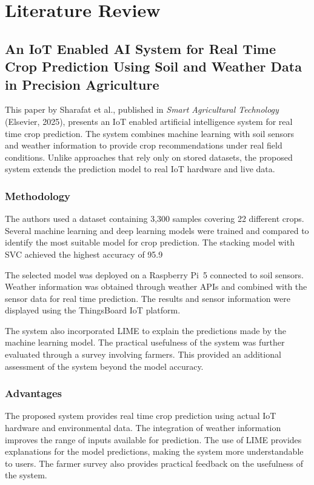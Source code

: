 \chapter{Literature Review}

\section{An IoT Enabled AI System for Real Time Crop Prediction Using Soil and Weather Data in Precision Agriculture}

This paper by Sharafat et al., published in \emph{Smart Agricultural Technology} (Elsevier, 2025), presents an IoT enabled artificial intelligence system for real time crop prediction. The system combines machine learning with soil sensors and weather information to provide crop recommendations under real field conditions. Unlike approaches that rely only on stored datasets, the proposed system extends the prediction model to real IoT hardware and live data.

\subsection{Methodology}

The authors used a dataset containing 3,300 samples covering 22 different crops. Several machine learning and deep learning models were trained and compared to identify the most suitable model for crop prediction. The stacking model with SVC achieved the highest accuracy of 95.9%

The selected model was deployed on a Raspberry Pi~5 connected to soil sensors. Weather information was obtained through weather APIs and combined with the sensor data for real time prediction. The results and sensor information were displayed using the ThingsBoard IoT platform.

The system also incorporated LIME to explain the predictions made by the machine learning model. The practical usefulness of the system was further evaluated through a survey involving farmers. This provided an additional assessment of the system beyond the model accuracy.

\subsection{Advantages}

The proposed system provides real time crop prediction using actual IoT hardware and environmental data. The integration of weather information improves the range of inputs available for prediction. The use of LIME provides explanations for the model predictions, making the system more understandable to users. The farmer survey also provides practical feedback on the usefulness of the system.

